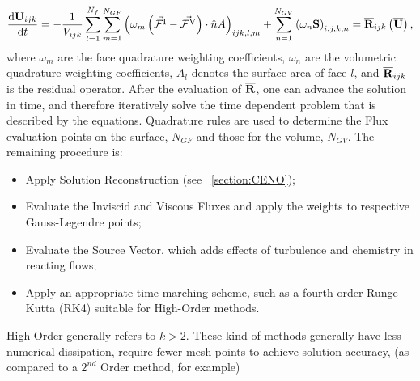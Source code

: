 \begin{equation}
\label{eqn:semi_discrete}
 \frac{\mathrm{d}\overline{\mathbf{U}}_{ijk}}{\mathrm{d}t} =
 - \frac{1}{{V}_{ijk}} \sum_{l=1}^{N_f} 
 \sum_{m=1}^{N_{GF}} \left( \omega_m \left(\vec{\mathcal{F}^{\mathrm{I}}} - 
 \vec{\mathcal{F}^{\mathrm{V}}} \right)\cdot \hat{n} {A} \right)_{ijk,l,m}
 + \sum_{n=1}^{N_{GV}} \left( \omega_n {\mathbf{S}} \right)_{i,j,k,n}
 = \overline{\mathbf{R}}_{ijk} \left( \overline{\mathbf{U}} \right),
\end{equation}
where $\omega_m$ are the face quadrature weighting coefficients, $\omega_n$ are the volumetric quadrature weighting coefficients, $A_l$ denotes the surface area of face $l$, and $\overline{\mathbf{R}}_{ijk}$ is the residual operator. After the evaluation of $\overline{\mathbf{R}}$, one can advance the solution in time, and therefore iteratively solve the time dependent problem that is described by the equations. Quadrature rules are used to determine the Flux evaluation points on the surface, $N_{GF}$ and those for the volume, $N_{GV}$. The remaining procedure is:
\begin{itemize}
\setlength\itemsep{0.1em}
 \item Apply Solution Reconstruction (see ~\ref{section:CENO});
 \item Evaluate the Inviscid and Viscous Fluxes and apply the weights to respective Gauss-Legendre points;
 \item Evaluate the Source Vector, which adds effects of turbulence and chemistry in reacting flows;
 \item Apply an appropriate time-marching scheme, such as a fourth-order Runge-Kutta (RK4) suitable for High-Order methods.
\end{itemize}
High-Order generally refers to $k>2$. These kind of methods generally have less numerical dissipation, require fewer mesh points to achieve solution accuracy, (as compared to a $2^{nd}$ Order method, for example)

